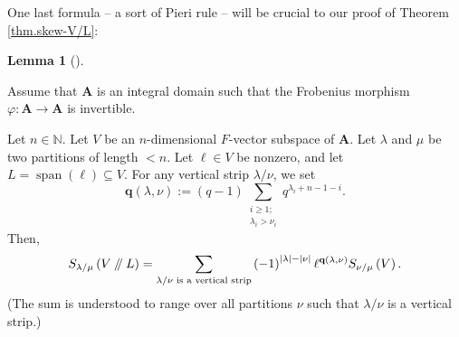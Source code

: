 \documentclass[numbers=enddot,12pt,final,onecolumn,notitlepage]{scrartcl}%
\numberwithin{exer}{section}
\theoremstyle{definition}
\newtheorem{lem}[theo]{Lemma}
\newenvironment{lemma}[1][]
{\begin{lem}[#1]\begin{leftbar}}
{\end{leftbar}\end{lem}}
\let\sumnonlimits\sum
\renewcommand{\sum}{\sumnonlimits\limits}
\newcommand{\sslash}{\mathbin{/\mkern-5mu/}}
\theoremstyle{plainsl}
\begin{document}
One last formula -- a sort of Pieri rule -- will be crucial to our proof of
Theorem \ref{thm.skew-V/L}:

\begin{lemma}
\label{lem.SlamVL-ie}Assume that $\mathbf{A}$ is an integral domain such that
the Frobenius morphism $\varphi:\mathbf{A}\rightarrow\mathbf{A}$ is invertible.

Let $n\in\mathbb{N}$. Let $V$ be an $n$-dimensional $F$-vector subspace of
$\mathbf{A}$. Let $\lambda$ and $\mu$ be two partitions of length $<n$. Let
$\ell\in V$ be nonzero, and let $L=\operatorname*{span}\left(  \ell\right)
\subseteq V$. For any vertical strip $\lambda/\nu$, we set%
\[
\mathbf{q}\left(  \lambda,\nu\right)  :=\left(  q-1\right)  \sum
_{\substack{i\geq1;\\\lambda_{i}>\nu_{i}}}q^{\lambda_{i}+n-1-i}.
\]
Then,%
\[
S_{\lambda/\mu}\left(  V\sslash L\right)  =\sum_{\lambda/\nu\text{ is a
vertical strip}}\left(  -1\right)  ^{\left\vert \lambda\right\vert -\left\vert
\nu\right\vert }\ell^{\mathbf{q}\left(  \lambda,\nu\right)  }S_{\nu/\mu
}\left(  V\right)  .
\]
(The sum is understood to range over all partitions $\nu$ such that
$\lambda/\nu$ is a vertical strip.)
\end{lemma}
\end{document}

